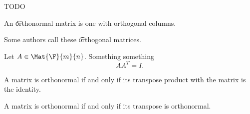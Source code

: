

TODO


An \t{orthonormal} matrix is one with orthogonal columns.

Some authors call these \t{orthogonal} matrices.


Let $A \in \Mat{\F}{m}{n}$.
Something something
$$
  AA^T = I.
$$


\begin{prop}

  A matrix is orthonormal if and only if its transpose product with the matrix is the identity.

\end{prop}

\begin{prop}

A matrix is orthonormal if and only if its transpose is orthonormal.

\end{prop}
